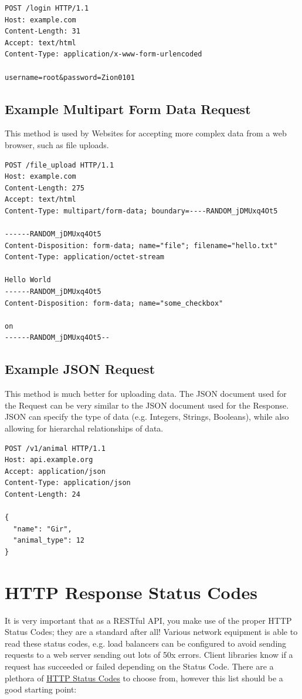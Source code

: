 \documentclass{book}
\begin{document}
\begin{verbatim}
POST /login HTTP/1.1
Host: example.com
Content-Length: 31
Accept: text/html
Content-Type: application/x-www-form-urlencoded

username=root&password=Zion0101
\end{verbatim}

\section{Example Multipart Form Data Request}

This method is used by Websites for accepting more complex data from a web browser, such as file uploads.

\begin{verbatim}
POST /file_upload HTTP/1.1
Host: example.com
Content-Length: 275
Accept: text/html
Content-Type: multipart/form-data; boundary=----RANDOM_jDMUxq4Ot5

------RANDOM_jDMUxq4Ot5
Content-Disposition: form-data; name="file"; filename="hello.txt"
Content-Type: application/octet-stream

Hello World
------RANDOM_jDMUxq4Ot5
Content-Disposition: form-data; name="some_checkbox"

on
------RANDOM_jDMUxq4Ot5--
\end{verbatim}

\section{Example JSON Request}

This method is much better for uploading data. The JSON document used for the Request can be very similar to the JSON document used for the Response. JSON can specify the type of data (e.g. Integers, Strings, Booleans), while also allowing for hierarchal relationships of data.

\begin{verbatim}
POST /v1/animal HTTP/1.1
Host: api.example.org
Accept: application/json
Content-Type: application/json
Content-Length: 24

{
  "name": "Gir",
  "animal_type": 12
}
\end{verbatim}


\chapter{HTTP Response Status Codes}

It is very important that as a RESTful API, you make use of the proper HTTP Status Codes; they are a standard after all! Various network equipment is able to read these status codes, e.g. load balancers can be configured to avoid sending requests to a web server sending out lots of 50x errors. Client libraries know if a request has succeeded or failed depending on the Status Code. There are a plethora of \href{http://www.w3.org/Protocols/rfc2616/rfc2616-sec10.html}{HTTP Status Codes} to choose from, however this list should be a good starting point:
\end{document}
